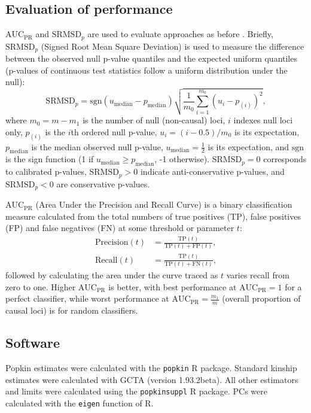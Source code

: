 \documentclass[11pt]{article}
\newcommand{\rmsd}{\text{SRMSD}_p}
\newcommand{\auc}{\text{AUC}_\text{PR}}
\begin{document}
\subsection{Evaluation of performance}

$\auc$ and $\rmsd$ are used to evaluate approaches as before \citep{yao_limitations_2022}.
Briefly, $\rmsd$ (Signed Root Mean Square Deviation) is used to measure the difference between the observed null p-value quantiles and the expected uniform quantiles (p-values of continuous test statistics follow a uniform distribution under the null):
$$
\rmsd
=
\text{sgn}(u_\text{median} - p_\text{median} ) \sqrt{ \frac{1}{m_0} \sum_{i = 1}^{m_0} \left( u_i - p_{(i)} \right)^2 },
$$
where
$m_0 = m - m_1$ is the number of null (non-causal) loci,
$i$ indexes null loci only,
$p_{(i)}$ is the $i$th ordered null p-value,
$u_i = ( i - 0.5 ) / m_0$ is its expectation,
$p_\text{median}$ is the median observed null p-value,
$u_\text{median} = \frac{1}{2}$ is its expectation,
and $\text{sgn}$ is the sign function (1 if $u_\text{median} \ge p_\text{median}$, -1 otherwise).
$\rmsd = 0$ corresponds to calibrated p-values, $\rmsd > 0$ indicate anti-conservative p-values, and $\rmsd < 0$ are conservative p-values.

$\auc$ (Area Under the Precision and Recall Curve) is a binary classification measure calculated from the total numbers of true positives (TP), false positives (FP) and false negatives (FN) at some threshold or parameter $t$:
\begin{align*}
  \text{Precision}(t)
  &=
    \frac{ \text{TP}(t) }{ \text{TP}(t) + \text{FP}(t) }
    , \\
  \text{Recall}(t)
  &=
    \frac{ \text{TP}(t) }{ \text{TP}(t) + \text{FN}(t) }
    ,
\end{align*}
followed by calculating the area under the curve traced as $t$ varies recall from zero to one.
Higher $\auc$ is better, with best performance at $\auc = 1$ for a perfect classifier, while worst performance at $\auc = \frac{m_1}{m}$ (overall proportion of causal loci) is for random classifiers.



\subsection{Software}

Popkin estimates were calculated with the \texttt{popkin} R package.
Standard kinship estimates were calculated with GCTA (version 1.93.2beta).
All other estimators and limits were calculated using the \texttt{popkinsuppl} R package.
PCs were calculated with the \texttt{eigen} function of R.
\end{document}
